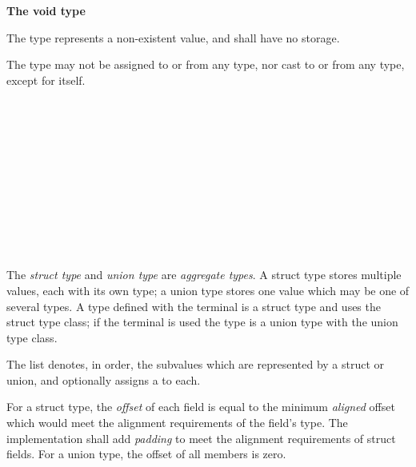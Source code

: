 \textbf{The void type}

\specsubsubitem
The  type represents a non-existent value, and shall have no
storage.

\specsubsubitem
The  type may not be assigned to or from any type, nor cast to or
from any type, except for itself.


\begin{grammar}
 \\
	 \terminal{\{}  \terminal{\}} \\
	 \terminal{\{}  \terminal{\}} \\

 \\
	 \optional{\terminal{,}} \\
	 \terminal{,}  \\

 \\
	 \terminal{:}  \\
	 \\
	 \\
\end{grammar}

\specsubsubitem
The \textit{struct type} and \textit{union type} are \textit{aggregate types}.
A struct type stores multiple values, each with its own type; a union type
stores one value which may be one of several types. A type defined with the
 terminal is a struct type and uses the struct type class; if
the  terminal is used the type is a union type with the union
type class.

\specsubsubitem
The  list denotes, in order, the subvalues which are
represented by a struct or union, and optionally assigns a  to
each.

\specsubsubitem
For a struct type, the \textit{offset} of each field is equal to the minimum
\textit{aligned} offset which would meet the alignment requirements of the
field's type. The implementation shall add \textit{padding} to meet the
alignment requirements of struct fields. For a union type, the offset of all
members is zero.

